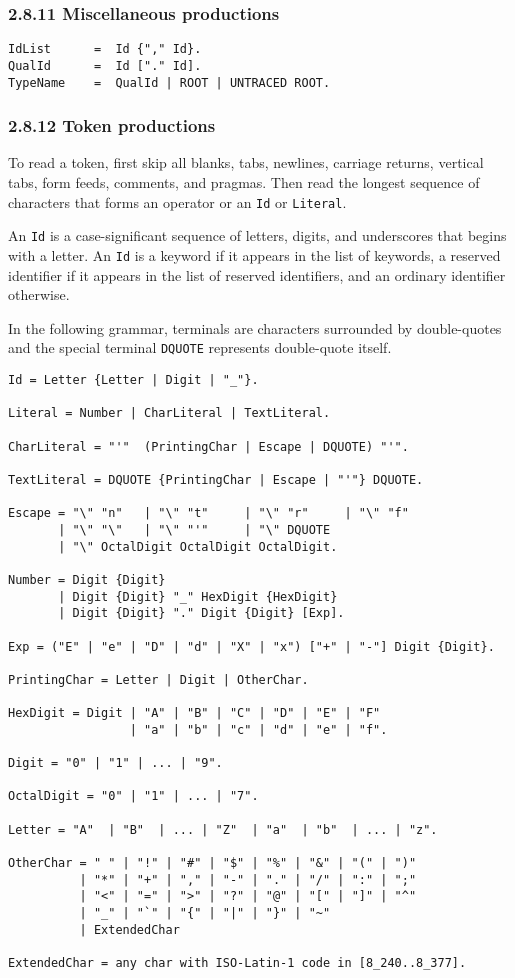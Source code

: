 \documentclass[10pt]{article}
\begin{document}
\subsubsection*{2.8.11 Miscellaneous productions}

\begin{verbatim}
IdList      =  Id {"," Id}.
QualId      =  Id ["." Id].
TypeName    =  QualId | ROOT | UNTRACED ROOT.
\end{verbatim}

\subsubsection*{2.8.12 Token productions}

To read a token, first skip all blanks, tabs, newlines, carriage returns,
vertical tabs, form feeds, comments, and pragmas.  Then read the longest
sequence of characters that forms an operator or an \verb|Id| or
\verb|Literal|.

An \verb|Id| is a case-significant sequence of letters, digits, and
underscores that begins with a letter.  An \verb|Id| is a keyword if it
appears in the list of keywords, a reserved identifier if it appears in the
list of reserved identifiers, and an ordinary identifier otherwise.

In the following grammar, terminals are characters surrounded by double-quotes
and the special terminal \verb|DQUOTE| represents double-quote itself.

\begin{verbatim}
Id = Letter {Letter | Digit | "_"}.

Literal = Number | CharLiteral | TextLiteral.

CharLiteral = "'"  (PrintingChar | Escape | DQUOTE) "'".

TextLiteral = DQUOTE {PrintingChar | Escape | "'"} DQUOTE.

Escape = "\" "n"   | "\" "t"     | "\" "r"     | "\" "f"
       | "\" "\"   | "\" "'"     | "\" DQUOTE
       | "\" OctalDigit OctalDigit OctalDigit.

Number = Digit {Digit}
       | Digit {Digit} "_" HexDigit {HexDigit}
       | Digit {Digit} "." Digit {Digit} [Exp].

Exp = ("E" | "e" | "D" | "d" | "X" | "x") ["+" | "-"] Digit {Digit}.

PrintingChar = Letter | Digit | OtherChar.

HexDigit = Digit | "A" | "B" | "C" | "D" | "E" | "F"
                 | "a" | "b" | "c" | "d" | "e" | "f".

Digit = "0" | "1" | ... | "9".

OctalDigit = "0" | "1" | ... | "7".

Letter = "A"  | "B"  | ... | "Z"  | "a"  | "b"  | ... | "z".

OtherChar = " " | "!" | "#" | "$" | "%" | "&" | "(" | ")"
          | "*" | "+" | "," | "-" | "." | "/" | ":" | ";"
          | "<" | "=" | ">" | "?" | "@" | "[" | "]" | "^"
          | "_" | "`" | "{" | "|" | "}" | "~"
          | ExtendedChar

ExtendedChar = any char with ISO-Latin-1 code in [8_240..8_377].
\end{verbatim}
\end{document}
